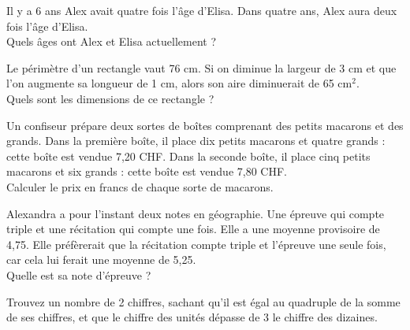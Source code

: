
\begin{exercice}
Il y a 6 ans Alex avait quatre fois l’âge d’Elisa. Dans quatre ans, Alex aura deux fois 	l’âge d’Elisa.\\
 Quels âges ont Alex et Elisa actuellement ?
\end{exercice}

\begin{exercice}
Le périmètre d’un rectangle vaut 76 cm. Si on diminue la largeur de 3 cm et que l’on augmente sa longueur de 1 cm, alors son aire diminuerait de 65 cm$^2$.\\
Quels sont les dimensions de ce rectangle ?
\end{exercice}

\begin{exercice}
Un confiseur prépare deux sortes de boîtes comprenant des petits macarons et des grands. Dans la première boîte, il place dix petits macarons et quatre grands : cette boîte est vendue 7,20 CHF. Dans la seconde boîte, il place cinq petits macarons et six grands : cette boîte est vendue 7,80 CHF.\\
Calculer le prix en francs de chaque sorte de macarons.
\end{exercice}

\begin{exercice}
Alexandra a pour l'instant deux notes en géographie. Une épreuve qui compte triple et une récitation qui compte une fois. Elle a une moyenne provisoire de 4,75. Elle préfèrerait que la récitation compte triple et l'épreuve une seule fois, car cela lui ferait une moyenne de 5,25.\\
Quelle est sa note d'épreuve ?
\end{exercice}

\begin{exercice}
Trouvez un nombre de 2 chiffres, sachant qu'il est égal au quadruple de la somme de ses chiffres, et que le chiffre des unités dépasse de 3 le chiffre des dizaines.
\end{exercice}
